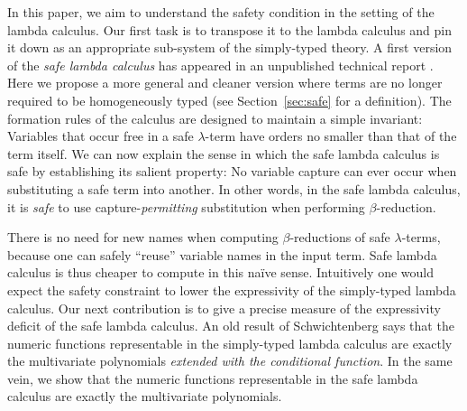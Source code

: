 In this paper, we aim to understand the safety condition in the
setting of the lambda calculus. Our first task is to transpose it to
the lambda calculus and pin it down as an appropriate sub-system of
the simply-typed theory. A first version of the \emph{safe lambda
  calculus} has appeared in an unpublished technical report
\cite{safety-mirlong2004}. Here we propose a more general and cleaner
version where terms are no longer required to be homogeneously typed
(see Section~\ref{sec:safe} for a definition). The formation rules of
the calculus are designed to maintain a simple invariant: Variables
that occur free in a safe $\lambda$-term have orders no smaller than
that of the term itself.  We can now explain the sense in which the
safe lambda calculus is safe by establishing its salient property: No
variable capture can ever occur when substituting a safe term into
another. In other words, in the safe lambda calculus, it is
\emph{safe} to use capture-\emph{permitting} substitution when
performing $\beta$-reduction.


There is no need for new names when computing $\beta$-reductions of
safe $\lambda$-terms, because one can safely ``reuse'' variable names
in the input term. Safe lambda calculus is thus cheaper to compute in
this na\"ive sense. Intuitively one would expect the safety constraint
to lower the expressivity of the simply-typed lambda calculus. Our
next contribution is to give a precise measure of the expressivity
deficit of the safe lambda calculus. An old result of Schwichtenberg
\cite{citeulike:622637} says that the numeric functions representable
in the simply-typed lambda calculus are exactly the multivariate
polynomials \emph{extended with the conditional function}.  In the
same vein, we show that the numeric functions representable in the
safe lambda calculus are exactly the multivariate polynomials.

